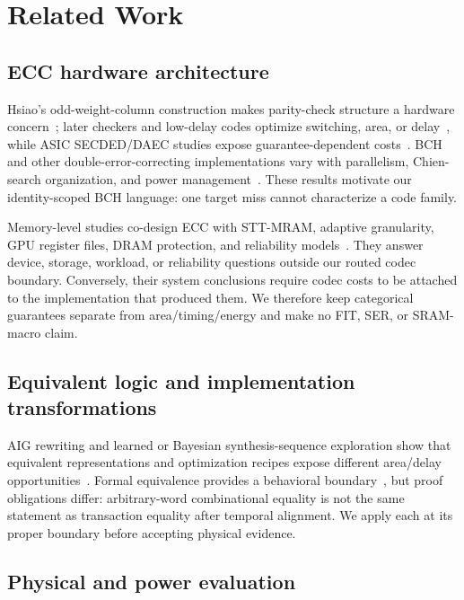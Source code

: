 \documentclass[conference,10pt]{IEEEtran}
\begin{document}
\section{Related Work}

\subsection{ECC hardware architecture}

Hsiao's odd-weight-column construction makes parity-check structure a hardware concern~\cite{hsiao1970}; later checkers and low-delay codes optimize switching, area, or delay~\cite{ghosh2004,reviriego2013}, while ASIC SECDED/DAEC studies expose guarantee-dependent costs~\cite{tripathi2020}. BCH and other double-error-correcting implementations vary with parallelism, Chien-search organization, and power management~\cite{naseer2008,chen2004,wong2011,yoo2016,das2019,lagendijk2026}. These results motivate our identity-scoped BCH language: one target miss cannot characterize a code family.

Memory-level studies co-design ECC with STT-MRAM, adaptive granularity, GPU register files, DRAM protection, and reliability models~\cite{delbel2014,pajouhi2015,nair2016,wei2020,lee2022,yoon2011}. They answer device, storage, workload, or reliability questions outside our routed codec boundary. Conversely, their system conclusions require codec costs to be attached to the implementation that produced them. We therefore keep categorical guarantees separate from area/timing/energy and make no FIT, SER, or SRAM-macro claim.

\subsection{Equivalent logic and implementation transformations}

AIG rewriting and learned or Bayesian synthesis-sequence exploration show that equivalent representations and optimization recipes expose different area/delay opportunities~\cite{mishchenko2006,hosny2020,neto2019,grosnit2022}. Formal equivalence provides a behavioral boundary~\cite{kuehlmann1997,kuehlmann2002}, but proof obligations differ: arbitrary-word combinational equality is not the same statement as transaction equality after temporal alignment. We apply each at its proper boundary before accepting physical evidence.

\subsection{Physical and power evaluation}
\end{document}
